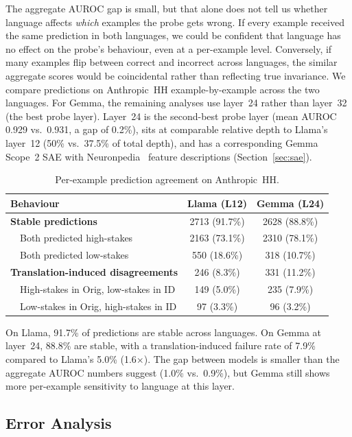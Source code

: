 \documentclass{article}
\newcommand{\auroc}{AUROC\xspace}
\begin{document}
The aggregate \auroc gap is small, but that alone does not tell us whether
language affects \emph{which} examples the probe gets wrong.
If every example received the same prediction in both languages, we could
be confident that language has no effect on the probe's behaviour, even at
a per-example level.
Conversely, if many examples flip between correct and incorrect across
languages, the similar aggregate scores would be coincidental rather than
reflecting true invariance.
We compare predictions on Anthropic~HH example-by-example across the two
languages.
For Gemma, the remaining analyses use layer~24 rather than layer~32 (the
best probe layer).
Layer~24 is the second-best probe layer (mean \auroc 0.929 vs.\ 0.931, a
gap of 0.2\%), sits at comparable relative depth to Llama's layer~12
(50\% vs.\ 37.5\% of total depth), and has a corresponding Gemma Scope~2 SAE with
Neuronpedia~\cite{neuronpedia} feature descriptions
(Section~\ref{sec:sae}).
\begin{table}[t]
\centering
\caption{Per-example prediction agreement on Anthropic~HH.}
\label{tab:agreement}
\begin{tabular}{lcc}
\toprule
Behaviour                                   & Llama (L12) & Gemma (L24) \\
\midrule
\textbf{Stable predictions}                 & 2713 (91.7\%) & 2628 (88.8\%) \\
\ \ Both predicted high-stakes              & 2163 (73.1\%) & 2310 (78.1\%) \\
\ \ Both predicted low-stakes               & 550  (18.6\%) &  318 (10.7\%) \\
\midrule
\textbf{Translation-induced disagreements}  &  246 (8.3\%)  &  331 (11.2\%) \\
\ \ High-stakes in Orig, low-stakes in ID   &  149 (5.0\%)  &  235 (7.9\%)  \\
\ \ Low-stakes in Orig, high-stakes in ID   &   97 (3.3\%)  &   96 (3.2\%)  \\
\bottomrule
\end{tabular}
\end{table}
On Llama, 91.7\% of predictions are stable across languages.
On Gemma at layer~24, 88.8\% are stable, with a translation-induced failure
rate of 7.9\% compared to Llama's 5.0\% (1.6$\times$).
The gap between models is smaller than the aggregate \auroc numbers suggest
(1.0\% vs.\ 0.9\%), but Gemma still shows more per-example sensitivity to
language at this layer.

\subsection{Error Analysis}
\label{sec:errors}
\end{document}

